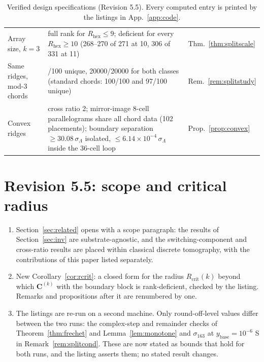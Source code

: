 \documentclass[11pt,a4paper]{article}
\theoremstyle{definition}
\theoremstyle{remark}
\begin{document}
\begin{table}[!p]
\begin{tabularx}{\textwidth}{@{}>{\raggedright\arraybackslash}p{3.6cm}>{\raggedright\arraybackslash}X>{\raggedright\arraybackslash}p{2.6cm}@{}}
Array size, $k=3$ & full rank for $R_{\text{hex}}\le9$; deficient for every $R_{\text{hex}}\ge10$ (268--270 of 271 at 10, 306 of 331 at 11) & Thm.~\ref{thm:splitscale} \\
Same ridges, mod-3 chords & 100/100 unique, 20000/20000 for both classes (standard chords: 100/100 and 97/100 unique) & Rem.~\ref{rem:splitstudy} \\
Convex ridges & cross ratio 2; mirror-image 8-cell parallelograms share all chord data (102 placements); boundary separation $\ge30.08\,\sigma_\Lambda$ isolated, $\le6.14\times10^{-4}\,\sigma_\Lambda$ inside the 36-cell loop & Prop.~\ref{prop:convex} \\
\bottomrule
\end{tabularx}
\caption{Verified design specifications (Revision 5.5). Every computed entry is printed by the listings in App.~\ref{app:code}.}\label{tab:specs}
\end{table}

\section*{Revision 5.5: scope and critical radius}
\begin{enumerate}[noitemsep,leftmargin=*]
\item Section~\ref{sec:related} opens with a scope paragraph: the results of Section~\ref{sec:inv} are substrate-agnostic, and the switching-component and cross-ratio results are placed within classical discrete tomography, with the contributions of this paper listed separately.
\item New Corollary~\ref{cor:rcrit}: a closed form for the radius $R_{\text{crit}}(k)$ beyond which $\mathbf{C}^{(k)}$ with the boundary block is rank-deficient, checked by the listing. Remarks and propositions after it are renumbered by one.
\item The listings are re-run on a second machine. Only round-off-level values differ between the two runs: the complex-step and remainder checks of Theorem~\ref{thm:frechet} and Lemma~\ref{lem:monotone} and $\sigma_{163}$ at $y_{\text{base}} = 10^{-6}$ S in Remark~\ref{rem:splitcond}. These are now stated as bounds that hold for both runs, and the listing asserts them; no stated result changes.
\end{enumerate}

\end{document}
